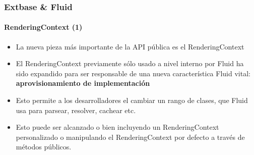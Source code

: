
\begin{frame}[fragile]
	\frametitle{Extbase \& Fluid}
	\framesubtitle{RenderingContext (1)}

	\lstset{basicstyle=\tiny\ttfamily}

	\begin{itemize}

		\item La nueva pieza más importante de la API pública es el RenderingContext

		\item El RenderingContext previamente sólo usado a nivel interno por Fluid ha sido
			expandido para ser responsable de una nueva característica Fluid vital:
			\textbf{aprovisionamiento de implementación}

		\item Esto permite a los desarrolladores el cambiar un rango de clases, que Fluid usa para
			parsear, resolver, cachear etc.

		\item Esto puede ser alcanzado o bien incluyendo un RenderingContext personalizado o
			manipulando el RenderingContext por defecto a través de métodos públicos.

	\end{itemize}

\end{frame}


